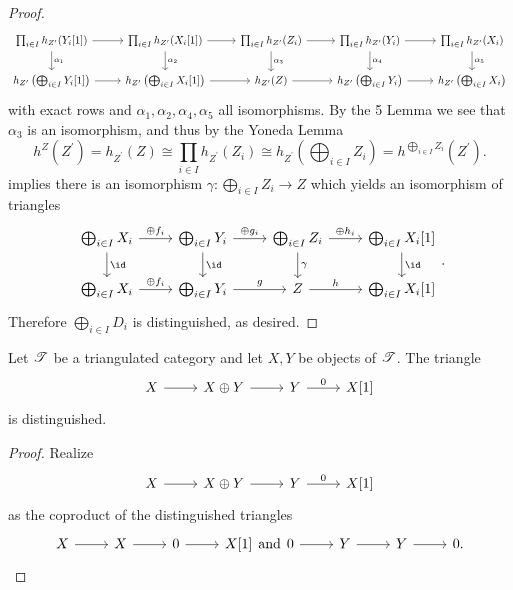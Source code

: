 \documentclass[10pt]{amsart}
\begin{document}
\begin{prop}
\begin{proof}
    $$\begin{tikzcd} 
      \prod_{i \in I}h_{Z^\prime}(Y_i[1]) \arrow{r}\arrow{d}{\alpha_1} & \prod_{i \in I}h_{Z^\prime}(X_i[1]) \arrow{r}\arrow{d}{\alpha_2} & \prod_{i \in I}h_{Z^\prime}(Z_i) \arrow{r}\arrow{d}{\alpha_3} & \prod_{i \in I}h_{Z^\prime}(Y_i) \arrow{r}\arrow{d}{\alpha_4} & \prod_{i \in I}h_{Z^\prime}(X_i)\arrow{d}{\alpha_5}\\
      h_{Z^\prime}\left(\bigoplus_{i \in I}Y_i[1]\right) \arrow{r} & h_{Z^\prime}\left(\bigoplus_{i \in I}X_i[1]\right) \arrow{r} & h_{Z^\prime}(Z) \arrow{r} & h_{Z^\prime}\left(\bigoplus_{i \in I}Y_i\right) \arrow{r} & h_{Z^\prime}\left(\bigoplus_{i \in I} X_i\right)
    \end{tikzcd}$$
    with exact rows and $\alpha_1, \alpha_2, \alpha_4, \alpha_5$ all isomorphisms.
    By the 5 Lemma we see that $\alpha_3$ is an isomorphism, and thus by the Yoneda Lemma
    $$h^Z(Z^\prime) = h_{Z^\prime}(Z) \cong \prod_{i \in I}h_{Z^\prime}(Z_i) \cong h_{Z^\prime}\left(\bigoplus_{i \in I}Z_i\right) = h^{\bigoplus_{i \in I} Z_i}(Z^\prime).$$
    implies there is an isomorphism $\gamma : \bigoplus_{i \in I} Z_i \rightarrow Z$ which yields an isomorphism of triangles
    $$\begin{tikzcd}
      \bigoplus_{i \in I} X_i \arrow{d}{\id}\arrow{r}{\oplus f_i} & \bigoplus_{i \in I}Y_i \arrow{d}{\id}\arrow{r}{\oplus g_i} & \bigoplus_{i \in I} Z_i \arrow{d}{\gamma}\arrow{r}{\oplus h_i} & \bigoplus_{i \in I} X_i[1]\arrow{d}{\id}\\
      \bigoplus_{i \in I} X_i \arrow{r}{\oplus f_i} & \bigoplus_{i \in I}Y_i \arrow{r}{g} & Z \arrow{r}{h} & \bigoplus_{i \in I} X_i[1]
    \end{tikzcd}.$$
    Therefore $\bigoplus_{i \in I}D_i$ is distinguished, as desired.
  \end{proof}
\end{prop}

\begin{cor}\label{corsumtriangles}
  Let $\mathscr{T}$ be a triangulated category and let $X,Y$ be objects of $\mathscr{T}$.
  The triangle
  $$\begin{tikzcd}
    X \arrow{r} & X \oplus Y \arrow{r} & Y \arrow{r}{0} & X[1]
  \end{tikzcd}$$
  is distinguished.
  
  \begin{proof}
    Realize 
    $$\begin{tikzcd}
      X \arrow{r} & X \oplus Y \arrow{r} & Y \arrow{r}{0} & X[1]
    \end{tikzcd}$$
    as the coproduct of the distinguished triangles
    $$\begin{tikzcd}
      X \arrow{r} & X \arrow{r} & 0\arrow{r} & X[1]
    \end{tikzcd}
    \text{and}
    \begin{tikzcd}
      0 \arrow{r} & Y \arrow{r} & Y \arrow{r} & 0.
    \end{tikzcd}$$
  \end{proof}
\end{cor}
\end{document}
